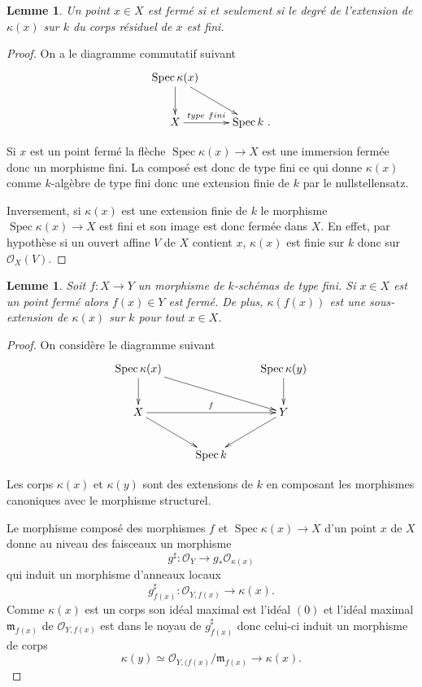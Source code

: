 \documentclass[A4, 11pt]{article}
\newtheorem{lem}[defin]{Lemme}
\begin{document}
\begin{lem} Un point $x\in X$ est fermé si et seulement si le degré de l'extension de $\kappa(x)$ sur $k$ du corps résiduel de $x$ est fini. 
\end{lem}
\begin{proof}
On a le diagramme commutatif suivant
$$\xymatrix{
 \operatorname{Spec} \kappa(x) \ar[d] \ar[dr] & \\
  X \ar[r]^-{type ~fini} & \operatorname{Spec} k  ~.
}
$$

Si $x$ est un point fermé la flèche $\operatorname{Spec} \kappa(x) \rightarrow X$ est une immersion fermée donc un morphisme fini. La composé est donc de type fini ce qui donne $\kappa(x)$ comme $k$-algèbre de type fini donc une extension finie de $k$ par le nullstellensatz. 

Inversement, si $\kappa(x)$ est une extension finie de $k$ le morphisme $\operatorname{Spec} \kappa(x) \rightarrow X$ est fini et son image est donc fermée dans $X$. En effet, par hypothèse si un ouvert affine $V$ de $X$ contient $x$, $\kappa(x)$ est finie sur $k$ donc sur $\mathcal{O}_X(V)$.  

\end{proof}
\begin{lem} Soit $f\colon X\rightarrow Y$ un morphisme de $k$-schémas de type fini. Si $x\in X$ est un point fermé alors $f(x) \in Y$ est fermé. De plus, $\kappa(f(x))$ est une sous-extension de $\kappa(x)$ sur $k$ pour tout $x\in X$. 
\end{lem}
\begin{proof}
On considère le diagramme suivant
$$\xymatrix{
 \operatorname{Spec} \kappa(x) \ar[d] \ar[drr]&   &\operatorname{Spec} \kappa(y) \ar[d] \\
  X \ar[rr]^{f} \ar[dr]&  & Y \ar[ld]\\
   & \operatorname{Spec} k & 
}
$$

Les corps $\kappa(x)$ et $\kappa(y)$ sont des extensions de $k$ en composant les morphismes canoniques avec le morphisme structurel. 

Le morphisme composé des morphismes $f$ et $\operatorname{Spec}\kappa(x) \rightarrow X$ d'un point $x$ de $X$ donne au niveau des faisceaux un morphisme 
$$g^{\sharp}\colon \mathcal{O}_Y \longrightarrow g_* \mathcal{O}_{\kappa(x)}$$
qui induit un morphisme d'anneaux locaux 
$$g^{\sharp}_{f(x)}\colon \mathcal{O}_{Y,f(x)} \longrightarrow \kappa(x).$$
Comme $\kappa(x)$ est un corps son idéal maximal est l'idéal $(0)$ et l'idéal maximal $\mathfrak{m}_{f(x)}$ de $\mathcal{O}_{Y,f(x)}$ est dans le noyau de $g^{\sharp}_{f(x)}$ donc celui-ci induit un morphisme de corps 
$$\kappa(y) \simeq \mathcal{O}_{Y,(f(x)}/\mathfrak{m}_{f(x)} \longrightarrow \kappa(x).$$

\end{proof}
\end{document}
